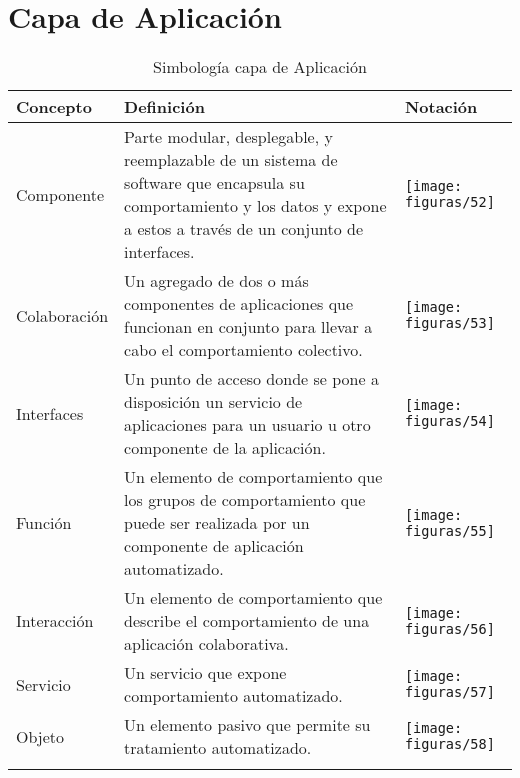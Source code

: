 \section{Capa de Aplicación}
  \begin{longtable}
  	{m{3cm}m{4.8cm}m{5.2cm}}
  	\hline
  	\rowcolor[HTML]{0073a1}
  	{\color[HTML]{FFFFFF} \textbf{Concepto}} & {\color[HTML]{FFFFFF} \textbf{Definición}} & {\color[HTML]{FFFFFF} \textbf{Notación}} \\
  	\hline
	Componente & Parte modular, desplegable, y reemplazable de un sistema de software que encapsula su comportamiento y los datos y expone a estos a través de un conjunto de interfaces. & \texttt{[image: figuras/52]} \\ \hline
	Colaboración & Un agregado de dos o más componentes de aplicaciones que funcionan en conjunto para llevar a cabo el comportamiento colectivo. & \texttt{[image: figuras/53]} \\ \hline
	Interfaces & Un punto de acceso donde se pone a disposición un servicio de aplicaciones para un usuario u otro componente de la aplicación. & \texttt{[image: figuras/54]} \\ \hline
	Función & Un elemento de comportamiento que los grupos de comportamiento que puede ser realizada por un componente de aplicación automatizado. & \texttt{[image: figuras/55]} \\ \hline
	Interacción & Un elemento de comportamiento que describe el comportamiento de una aplicación colaborativa. & \texttt{[image: figuras/56]} \\ \hline
	Servicio & Un servicio que expone comportamiento automatizado. & \texttt{[image: figuras/57]} \\ \hline
	Objeto & Un elemento pasivo que permite su tratamiento automatizado. & \texttt{[image: figuras/58]} \\
	\bottomrule
	\captionsetup{width=.95\textwidth}
	\caption{Simbología capa de Aplicación}
	\label{tabla30}
  \end{longtable}

\newpage
